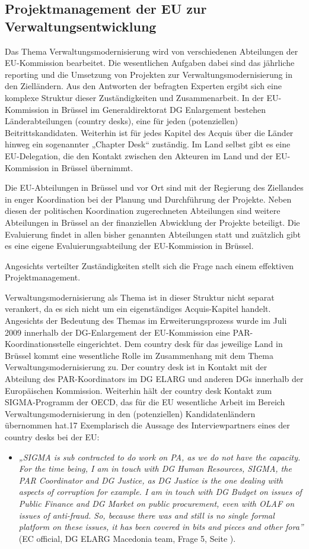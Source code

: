 \subsection{Projektmanagement der EU zur Verwaltungsentwicklung}
Das Thema Verwaltungsmodernisierung wird von verschiedenen Abteilungen der EU-Kommission bearbeitet. Die wesentlichen Aufgaben dabei sind das jährliche reporting und die Umsetzung von Projekten zur Verwaltungsmodernisierung in den Zielländern. Aus den Antworten der befragten Experten ergibt sich eine komplexe Struktur dieser Zuständigkeiten und Zusammenarbeit. In der EU-Kommission in Brüssel im Generaldirektorat DG Enlargement bestehen Länderabteilungen (country desks), eine für jeden (potenziellen) Beitrittskandidaten. Weiterhin ist für jedes Kapitel des Acquis über die Länder hinweg ein sogenannter „Chapter Desk“ zuständig. Im Land selbst gibt es eine EU-Delegation, die den Kontakt zwischen den Akteuren im Land und der EU-Kommission in Brüssel übernimmt.\par
Die EU-Abteilungen in Brüssel und vor Ort sind mit der Regierung des Ziellandes in enger Koordination bei der Planung und Durchführung der Projekte. Neben diesen der politischen Koordination zugerechneten Abteilungen sind weitere Abteilungen in Brüssel an der finanziellen Abwicklung der Projekte beteiligt. Die Evaluierung findet in allen bisher genannten Abteilungen statt und zuätzlich gibt es eine eigene Evaluierungsabteilung der EU-Kommission in Brüssel.\par
Angesichts verteilter Zuständigkeiten stellt sich die Frage nach einem effektiven Projektmanagement.
\par
Verwaltungsmodernisierung als Thema ist in dieser Struktur nicht separat verankert, da es sich nicht um ein eigenständiges Acquis-Kapitel handelt. Angesichts der Bedeutung des Themas im Erweiterungsprozess wurde im Juli 2009 innerhalb der DG-Enlargement der EU-Kommission eine PAR-Koordinationsstelle eingerichtet. Dem country desk für das jeweilige Land in Brüssel kommt eine wesentliche Rolle im Zusammenhang mit dem Thema Verwaltungsmodernisierung zu. Der country desk ist in Kontakt mit der Abteilung des PAR-Koordinators im DG ELARG und anderen DGs innerhalb der Europäischen Kommission. Weiterhin hält der country desk Kontakt zum SIGMA-Programm der OECD, das für die EU wesentliche Arbeit im Bereich Verwaltungsmodernisierung in den (potenziellen) Kandidatenländern übernommen hat.17 Exemplarisch die Aussage des Interviewpartners eines der country desks bei der EU:
\begin{itemize}[label={}]
\item \textit{„SIGMA is sub contracted to do work on PA, as we do not have the capacity. For the time being, I am in touch with DG Human Resources, SIGMA, the PAR Coordinator and DG Justice, as DG Justice is the one dealing with aspects of corruption for example. I am in touch with DG Budget on issues of Public Finance and DG Market on public procurement, even with OLAF on issues of anti-fraud. So, because there was and still is no single formal platform on these issues, it has been covered in bits and pieces and other fora”} (EC official, DG ELARG Macedonia team, Frage 5, Seite \pageref{sec:admin}).
\end{itemize}
